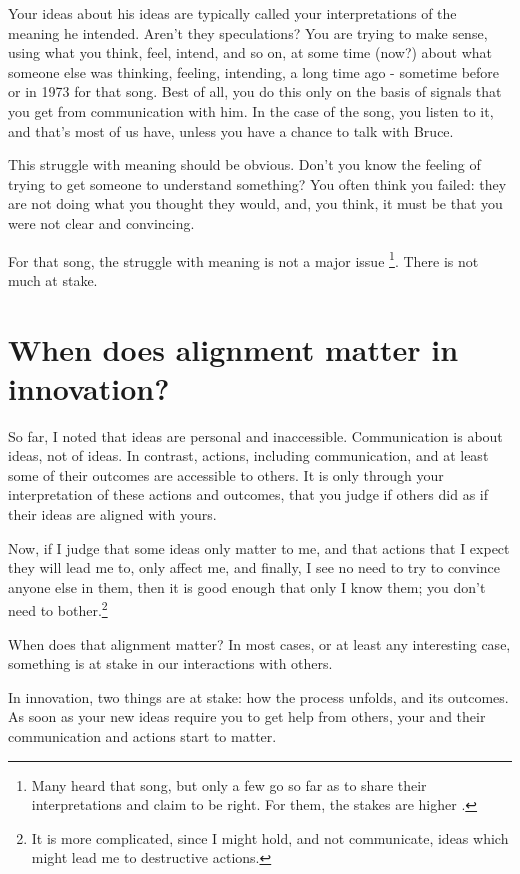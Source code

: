 Your ideas about his ideas are typically called your interpretations of the meaning he intended. Aren't they speculations? You are trying to make sense, using what you think, feel, intend, and so on, at some time (now?) about what someone else was thinking, feeling, intending, a long time ago - sometime before or in 1973 for that song. Best of all, you do this only on the basis of signals that you get from communication with him. In the case of the song, you listen to it, and that's most of us have, unless you have a chance to talk with Bruce. 

This struggle with meaning should be obvious. Don't you know the feeling of trying to get someone to understand something? You often think you failed: they are not doing what you thought they would, and, you think, it must be that you were not clear and convincing.

For that song, the struggle with meaning is not a major issue \footnote{Many heard that song, but only a few go so far as to share their interpretations and claim to be right. For them, the stakes are higher \cite{songmeanings-lost-in-the-flood}.}. There is not much at stake.


\section{When does alignment matter in innovation?}
\label{c1-s8}
So far, I noted that ideas are personal and inaccessible. Communication is about ideas, not of ideas. In contrast, actions, including communication, and at least some of their outcomes are accessible to others. It is only through your interpretation of these actions and outcomes, that you judge if others did as if their ideas are aligned with yours.

Now, if I judge that some ideas only matter to me, and that actions that I expect they will lead me to, only affect me, and finally, I see no need to try to convince anyone else in them, then it is good enough that only I know them; you don't need to bother.\footnote{It is more complicated, since I might hold, and not communicate, ideas which might lead me to destructive actions.}

When does that alignment matter? In most cases, or at least any interesting case, something is at stake in our interactions with others.

In innovation, two things are at stake: how the process unfolds, and its outcomes. As soon as your new ideas require you to get help from others, your and their communication and actions start to matter. 

